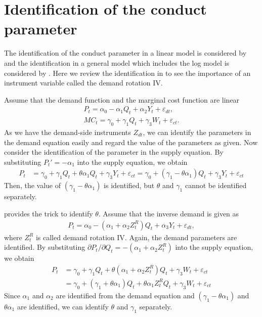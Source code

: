 \documentclass[11pt, a4paper]{article}
\begin{document}
\section{Identification of the conduct parameter}
The identification of the conduct parameter in a linear model is considered by \cite{bresnahan1982oligopoly} and the identification in a general model which includes the log model is considered by \cite{lau1982identifying}.
Here we review the identification in \cite{bresnahan1982oligopoly} to see the importance of an instrument variable called the demand rotation IV.

Assume that the demand function and the marginal cost function are linear
\begin{align}
    P_{t}=\alpha_0 - \alpha_1 Q_{t} + \alpha_2 Y_t + \varepsilon_{dt},\\
    MC_{t} = \gamma_0 + \gamma_1 Q_t + \gamma_3 W_t + \varepsilon_{ct}.
\end{align}
As we have the demand-side instruments $Z_{dt}$, we can identify the parameters in the demand equation easily and regard the value of the parameters as given.
Now consider the identification of the parameter in the supply equation.
By substituting $P_t'= - \alpha_1$ into the supply equation, we obtain
\begin{align}
    P_{t}&=\gamma_0+\gamma_1 Q_t + \theta\alpha_1 Q_t + \gamma_3 Y_t + \varepsilon_{ct} =\gamma_0+\left(\gamma_1- \theta\alpha_1\right) Q_t + \gamma_3 Y_t + \varepsilon_{ct} 
\end{align}
Then, the value of $(\gamma_1- \theta\alpha_1)$ is identified, but $\theta$ and $\gamma_1$ cannot be identified separately.

\cite{bresnahan1982oligopoly} provides the trick to identify $\theta$. 
Assume that the inverse demand is given as 
\begin{align}
    P_{t}=\alpha_0 - (\alpha_1+\alpha_2 Z^R_t) Q_{t} + \alpha_3 Y_t + \varepsilon_{dt},
\end{align}
where $Z^R_t$ is called demand rotation IV.
Again, the demand parameters are identified.
By substituting $\partial P_t/\partial Q_t = -(\alpha_1+\alpha_2 Z^R_t)$ into the supply equation, we obtain
\begin{align}
    P_{t}&=\gamma_0+\gamma_1 Q_t + \theta (\alpha_1+\alpha_2 Z^R_t) Q_t + \gamma_3 W_t + \varepsilon_{ct} \\
    &= \gamma_0 + (\gamma_1 + \theta \alpha_1) Q_t + \theta\alpha_1 Z^R_tQ_t + \gamma_3 W_t + \varepsilon_{ct}  
\end{align}
Since $\alpha_1$ and $\alpha_2$ are identified from the demand equation and $(\gamma_1 - \theta\alpha_1)$ and $\theta \alpha_1$ are identified, we can identify $\theta$ and $\gamma_1$ separately.
\end{document}
